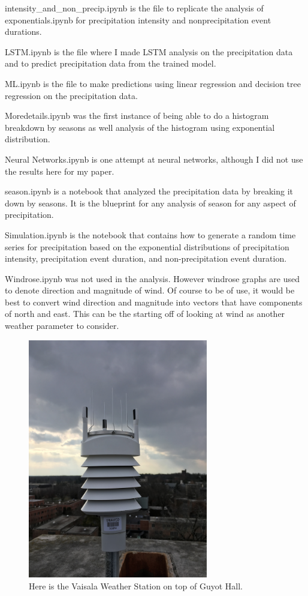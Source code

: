 \documentclass[11pt]{report}
\begin{document}
	intensity\_and\_non\_precip.ipynb is the file to replicate the analysis of exponentials.ipynb for precipitation intensity and nonprecipitation event durations. 
	
	LSTM.ipynb is the file where I made LSTM analysis on the precipitation data and to predict precipitation data from the trained model. 
	
	ML.ipynb is the file to make predictions using linear regression and decision tree regression on the precipitation data. 
	
	Moredetails.ipynb was the first instance of being able to do a histogram breakdown by seasons as well analysis of the histogram using exponential distribution. 
	
	Neural Networks.ipynb is one attempt at neural networks, although I did not use the results here for my paper. 
	
	season.ipynb is a notebook that analyzed the precipitation data by breaking it down by seasons. It is the blueprint for any analysis of season for any aspect of precipitation. 
	
	Simulation.ipynb is the notebook that contains how to generate a random time series for precipitation based on the exponential distributions of precipitation intensity, precipitation event duration, and non-precipitation event duration. 
	
	Windrose.ipynb was not used in the analysis. However windrose graphs are used to denote direction and magnitude of wind. Of course to be of use, it would be best to convert wind direction and magnitude into vectors that have components of north and east. This can be the starting off of looking at wind as another weather parameter to consider. 
	
	\begin{figure}[h]
		\centering
		\includegraphics[width = 0.7\textwidth]{Figures/weather_station.jpg}
		\caption[Vaisala Weather Station]{
			Here is the Vaisala Weather Station on top of Guyot Hall.  
		}
	\end{figure}
	
\end{document}
